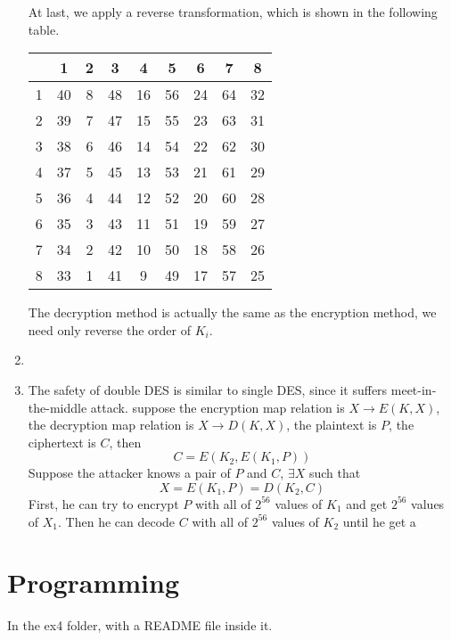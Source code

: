 \documentclass{article}
\begin{document}
\begin{enumerate}
At last, we apply a reverse transformation, which is shown in the following table.
\begin{center}
\begin{tabular}{c|cccccccc}
& 1 & 2 & 3 & 4 & 5 & 6 & 7 & 8 \\
\hline
1 & 40 & 8 & 48 & 16 & 56 & 24 & 64 & 32 \\
2 & 39 & 7 & 47 & 15 & 55 & 23 & 63 & 31 \\
3 & 38 & 6 & 46 & 14 & 54 & 22 & 62 & 30 \\
4 & 37 & 5 & 45 & 13 & 53 & 21 & 61 & 29 \\
5 & 36 & 4 & 44 & 12 & 52 & 20 & 60 & 28 \\
6 & 35 & 3 & 43 & 11 & 51 & 19 & 59 & 27 \\
7 & 34 & 2 & 42 & 10 & 50 & 18 & 58 & 26 \\
8 & 33 & 1 & 41 &  9 & 49 & 17 & 57 & 25 \\
\end{tabular}
\end{center}

The decryption method is actually the same as the encryption method, we need only reverse the order of $K_i$.

\item

\item
The safety of double DES is similar to single DES, since it suffers meet-in-the-middle attack. suppose the encryption map relation is $X\rightarrow E(K,X)$, the decryption map relation is $X\rightarrow D(K,X)$, the plaintext is $P$, the ciphertext is $C$, then
$$C=E(K_2,E(K_1,P))$$
Suppose the attacker knows a pair of $P$ and $C$, $\exists X$ such that $$X=E(K_1,P)=D(K_2,C)$$
First, he can try to encrypt $P$ with all of $2^{56}$ values of $K_1$ and get $2^{56}$ values of $X_1$. Then he can decode $C$ with all of $2^{56}$ values of $K_2$ until he get a 

\end{enumerate}

\section{Programming}
In the ex4 folder, with a README file inside it.
\end{document}
